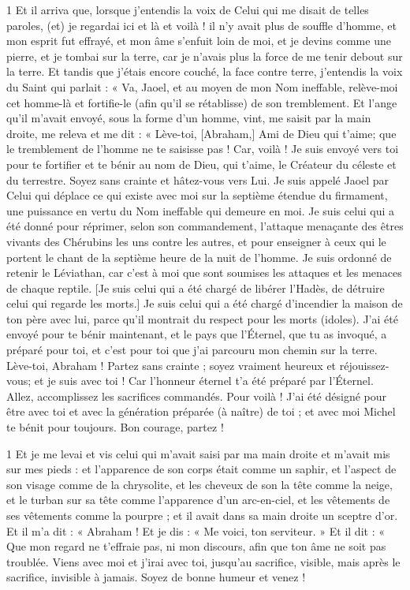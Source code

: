 \par 1 Et il arriva que, lorsque j'entendis la voix de Celui qui me disait de telles paroles, (et) je regardai ici et là et voilà ! il n'y avait plus de souffle d'homme, et mon esprit fut effrayé, et mon âme s'enfuit loin de moi, et je devins comme une pierre, et je tombai sur la terre, car je n'avais plus la force de me tenir debout sur la terre. Et tandis que j'étais encore couché, la face contre terre, j'entendis la voix du Saint qui parlait : « Va, Jaoel, et au moyen de mon Nom ineffable, relève-moi cet homme-là et fortifie-le (afin qu'il se rétablisse) de son tremblement. Et l'ange qu'il m'avait envoyé, sous la forme d'un homme, vint, me saisit par la main droite, me releva et me dit : « Lève-toi, [Abraham,] Ami de Dieu qui t'aime; que le tremblement de l'homme ne te saisisse pas ! Car, voilà ! Je suis envoyé vers toi pour te fortifier et te bénir au nom de Dieu, qui t'aime, le Créateur du céleste et du terrestre. Soyez sans crainte et hâtez-vous vers Lui. Je suis appelé Jaoel par Celui qui déplace ce qui existe avec moi sur la septième étendue du firmament, une puissance en vertu du Nom ineffable qui demeure en moi. Je suis celui qui a été donné pour réprimer, selon son commandement, l'attaque menaçante des êtres vivants des Chérubins les uns contre les autres, et pour enseigner à ceux qui le portent le chant de la septième heure de la nuit de l'homme. Je suis ordonné de retenir le Léviathan, car c'est à moi que sont soumises les attaques et les menaces de chaque reptile. [Je suis celui qui a été chargé de libérer l'Hadès, de détruire celui qui regarde les morts.] Je suis celui qui a été chargé d'incendier la maison de ton père avec lui, parce qu'il montrait du respect pour les morts (idoles). J'ai été envoyé pour te bénir maintenant, et le pays que l'Éternel, que tu as invoqué, a préparé pour toi, et c'est pour toi que j'ai parcouru mon chemin sur la terre. Lève-toi, Abraham ! Partez sans crainte ; soyez vraiment heureux et réjouissez-vous; et je suis avec toi ! Car l’honneur éternel t’a été préparé par l’Éternel. Allez, accomplissez les sacrifices commandés. Pour voilà ! J'ai été désigné pour être avec toi et avec la génération préparée (à naître) de toi ; et avec moi Michel te bénit pour toujours. Bon courage, partez !


\par 1 Et je me levai et vis celui qui m'avait saisi par ma main droite et m'avait mis sur mes pieds : et l'apparence de son corps était comme un saphir, et l'aspect de son visage comme de la chrysolite, et les cheveux de son la tête comme la neige, et le turban sur sa tête comme l'apparence d'un arc-en-ciel, et les vêtements de ses vêtements comme la pourpre ; et il avait dans sa main droite un sceptre d'or. Et il m'a dit : « Abraham ! Et je dis : « Me voici, ton serviteur. » Et il dit : « Que mon regard ne t’effraie pas, ni mon discours, afin que ton âme ne soit pas troublée. Viens avec moi et j'irai avec toi, jusqu'au sacrifice, visible, mais après le sacrifice, invisible à jamais. Soyez de bonne humeur et venez !

